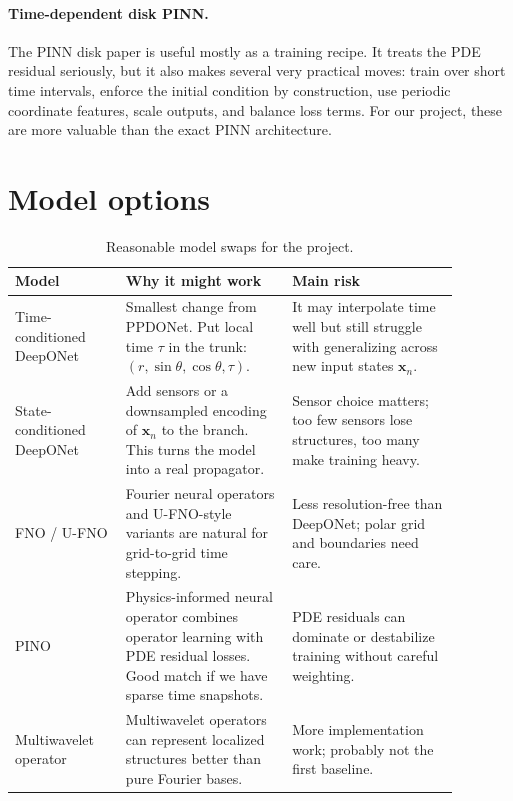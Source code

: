 \documentclass[11pt]{article}
\newcommand{\xfield}{\bm{x}}
\begin{document}
\paragraph{Time-dependent disk PINN.}
The PINN disk paper is useful mostly as a training recipe. It treats the PDE
residual seriously, but it also makes several very practical moves: train over
short time intervals, enforce the initial condition by construction, use
periodic coordinate features, scale outputs, and balance loss terms. For our
project, these are more valuable than the exact PINN architecture.

\section{Model options}

\begin{table}[h]
\centering
\begin{tabular}{p{0.22\linewidth}p{0.33\linewidth}p{0.33\linewidth}}
\toprule
Model & Why it might work & Main risk \\
\midrule
Time-conditioned DeepONet
& Smallest change from PPDONet. Put local time \(\tau\) in the trunk:
\((r,\sin\theta,\cos\theta,\tau)\).
& It may interpolate time well but still struggle with generalizing across new
input states \(\xfield_n\). \\
\addlinespace
State-conditioned DeepONet
& Add sensors or a downsampled encoding of \(\xfield_n\) to the branch. This
turns the model into a real propagator.
& Sensor choice matters; too few sensors lose structures, too many make training
heavy. \\
\addlinespace
FNO / U-FNO
& Fourier neural operators \cite{li2021fno} and U-FNO-style variants
\cite{wen2022uno} are natural for grid-to-grid time stepping.
& Less resolution-free than DeepONet; polar grid and boundaries need care. \\
\addlinespace
PINO
& Physics-informed neural operator \cite{li2021pino} combines operator learning
with PDE residual losses. Good match if we have sparse time snapshots.
& PDE residuals can dominate or destabilize training without careful weighting. \\
\addlinespace
Multiwavelet operator
& Multiwavelet operators \cite{gupta2021mwt} can represent localized structures
better than pure Fourier bases.
& More implementation work; probably not the first baseline. \\
\bottomrule
\end{tabular}
\caption{Reasonable model swaps for the project.}
\end{table}
\end{document}
